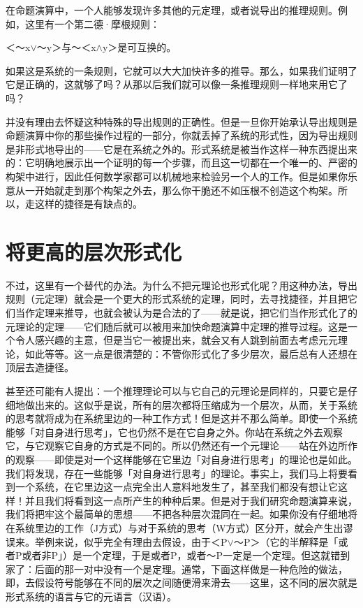 \documentclass[
  12pt,
  twoside,
  openright,
  oldfontcommands,
]{memoir}
\begin{document}
在命题演算中，一个人能够发现许多其他的元定理，或者说导出的推理规则。例如，这里有一个第二德·摩根规则：

＜～x$\vee$～y＞与～＜x$\wedge$y＞是可互换的。

如果这是系统的一条规则，它就可以大大加快许多的推导。那么，如果我们证明了它是正确的，这就够了吗？从那以后我们就可以像一条推理规则一样地来用它了吗？

并没有理由去怀疑这种特殊的导出规则的正确性。但是一旦你开始承认导出规则是命题演算中你的那些操作过程的一部分，你就丢掉了系统的形式性，因为导出规则是非形式地导出的------它是在系统之外的。形式系统是被当作这样一种东西提出来的：它明确地展示出一个证明的每一个步骤，而且这一切都在一个唯一的、严密的构架中进行，因此任何数学家都可以机械地来检验另一个人的工作。但是如果你乐意从一开始就走到那个构架之外去，那么你干脆还不如压根不创造这个构架。所以，走这样的捷径是有缺点的。

\section{将更高的层次形式化}

不过，这里有一个替代的办法。为什么不把元理论也形式化呢？用这种办法，导出规则（元定理）就会是一个更大的形式系统的定理，同时，去寻找捷径，并且把它们当作定理来推导，也就会被认为是合法的了------就是说，把它们当作形式化了的元理论的定理------它们随后就可以被用来加快命题演算中定理的推导过程。这是一个令人感兴趣的主意，但是当它一被提出来，就会又有人跳到前面去考虑元元理论，如此等等。这一点是很清楚的：不管你形式化了多少层次，最后总有人还想在顶层去造捷径。

甚至还可能有人提出：一个推理理论可以与它自己的元理论是同样的，只要它是仔细地做出来的。这似乎是说，所有的层次都将压缩成为一个层次，从而，关于系统的思考就将成为在系统里边的一种工作方式！但是这并不那么简单。即使一个系统能够「对自身进行思考」，它也仍然不是在它自身之外。你站在系统之外去观察它，与它观察它自身的方式是不同的。所以仍然还有一个元理论------站在外边所作的观察------即使是对一个这样能够在它里边「对自身进行思考」的理论也是如此。我们将发现，存在一些能够「对自身进行思考」的理论。事实上，我们马上将要看到一个系统，在它里边这一点完全出人意料地发生了，甚至我们都没有想让它这样！并且我们将看到这一点所产生的种种后果。但是对于我们研究命题演算来说，我们将把牢这个最简单的思想------不把各种层次混同在一起。如果你没有仔细地将在系统里边的工作（J方式）与对于系统的思考（W方式）区分开，就会产生出谬误来。举例来说，似乎完全有理由去假设，由于＜P$\vee$～P＞（它的半解释是「或者P或者非P」）是一个定理，于是或者P，或者～P一定是一个定理。但这就错到家了：后面的那一对中没有一个是定理。通常，下面这样做是一种危险的做法，即，去假设符号能够在不同的层次之间随便滑来滑去------这里，这不同的层次就是形式系统的语言与它的元语言（汉语）。
\end{document}
